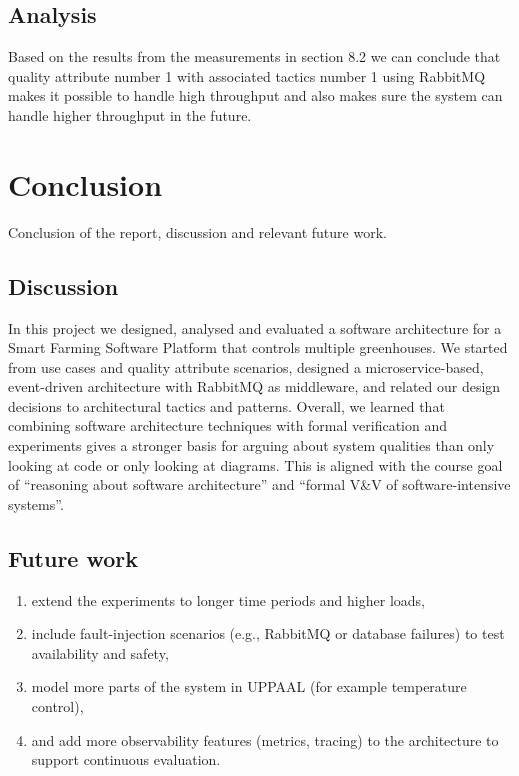 \documentclass[conference]{IEEEtran}
\begin{document}
\subsection{Analysis}
\label{sec:analysis}

Based on the results from the measurements in section 8.2 we can conclude that quality attribute number 1 with associated tactics number 1 using RabbitMQ makes it possible to handle high throughput and also makes sure the system can handle higher throughput in the future.


\section{Conclusion}
\label{sec:conclusion}
Conclusion of the report, discussion and relevant future work.

\subsection{Discussion}
\label{sec:Discussion}

In this project we designed, analysed and evaluated a software architecture for a Smart Farming Software Platform that controls multiple greenhouses. We started from use cases and quality attribute scenarios, designed a microservice-based, event-driven architecture with RabbitMQ as middleware, and related our design decisions to architectural tactics and patterns.
Overall, we learned that combining software architecture techniques with formal verification and experiments gives a stronger basis for arguing about system qualities than only looking at code or only looking at diagrams. This is aligned with the course goal of “reasoning about software architecture” and “formal V\&V of software-intensive systems”.


\subsection{Future work}

\label{sec:future_work}

\begin{enumerate}
    \item extend the experiments to longer time periods and higher loads,
    \item include fault-injection scenarios (e.g., RabbitMQ or database failures) to test availability and safety,
    \item model more parts of the system in UPPAAL (for example temperature control),
    \item and add more observability features (metrics, tracing) to the architecture to support continuous evaluation.
\end{enumerate}
\end{document}
